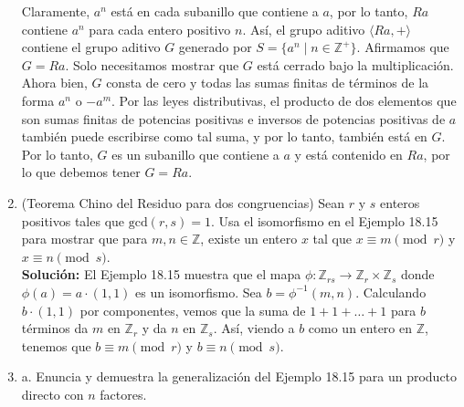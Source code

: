 \begin{enumerate}
	Claramente, $a^n$ está en cada subanillo que contiene a $a$, por lo tanto, $Ra$ contiene $a^n$ para cada entero positivo $n$. Así, el grupo aditivo $\langle Ra, + \rangle$ contiene el grupo aditivo $G$ generado por $S = \{a^n \mid n \in \mathbb{Z}^+\}$. Afirmamos que $G = Ra$. Solo necesitamos mostrar que $G$ está cerrado bajo la multiplicación. Ahora bien, $G$ consta de cero y todas las sumas finitas de términos de la forma $a^n$ o $-a^m$. Por las leyes distributivas, el producto de dos elementos que son sumas finitas de potencias positivas e inversos de potencias positivas de $a$ también puede escribirse como tal suma, y por lo tanto, también está en $G$. Por lo tanto, $G$ es un subanillo que contiene a $a$ y está contenido en $Ra$, por lo que debemos tener $G = Ra$.
	
	
	\item
	
	(Teorema Chino del Residuo para dos congruencias) Sean $r$ y $s$ enteros positivos tales que $\text{gcd}(r, s) = 1$. Usa el isomorfismo en el Ejemplo 18.15 para mostrar que para $m, n \in \mathbb{Z}$, existe un entero $x$ tal que $x \equiv m \pmod{r}$ y $x \equiv n \pmod{s}$.
	\\ \textbf{Solución:}
		El Ejemplo 18.15 muestra que el mapa $\phi : \mathbb{Z}_{rs} \rightarrow \mathbb{Z}_r \times \mathbb{Z}_s$ donde $\phi(a) = a \cdot (1, 1)$ es un isomorfismo. Sea $b = \phi^{-1}(m, n)$. Calculando $b \cdot (1, 1)$ por componentes, vemos que la suma de $1 + 1 + \ldots + 1$ para $b$ términos da $m$ en $\mathbb{Z}_r$ y da $n$ en $\mathbb{Z}_s$. Así, viendo a $b$ como un entero en $\mathbb{Z}$, tenemos que $b \equiv m \pmod{r}$ y $b \equiv n \pmod{s}$.
		
	\item
	
	a. Enuncia y demuestra la generalización del Ejemplo 18.15 para un producto directo con $n$ factores.
	

\end{enumerate}
